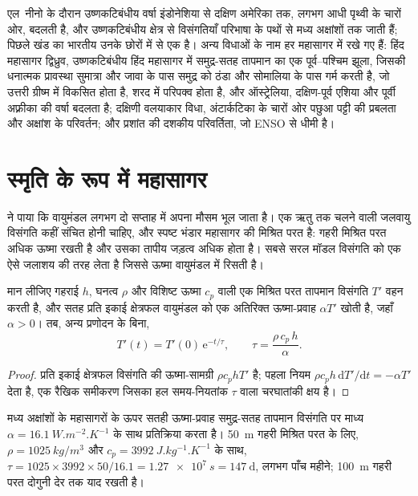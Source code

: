 एल~नीनो के दौरान उष्णकटिबंधीय वर्षा इंडोनेशिया से दक्षिण अमेरिका तक, लगभग आधी
पृथ्वी के चारों ओर, बदलती है, और उष्णकटिबंधीय क्षेत्र से विसंगतियाँ परिभाषा के पथों से मध्य अक्षांशों तक
जाती हैं; पिछले खंड का भारतीय  उनके छोरों में से एक है। अन्य विधाओं के नाम
हर महासागर में रखे गए हैं: हिंद महासागर द्विध्रुव, उष्णकटिबंधीय हिंद महासागर में समुद्र-सतह
तापमान का एक पूर्व--पश्चिम झूला, जिसकी धनात्मक प्रावस्था सुमात्रा और जावा के पास समुद्र को ठंडा
और सोमालिया के पास गर्म करती है, जो उत्तरी ग्रीष्म में विकसित होता है, शरद में परिपक्व होता है, और
ऑस्ट्रेलिया, दक्षिण-पूर्व एशिया और पूर्वी अफ़्रीका की वर्षा बदलता है; दक्षिणी वलयाकार विधा, अंटार्कटिका के चारों ओर
पछुआ पट्टी की प्रबलता और अक्षांश के परिवर्तन; और प्रशांत की दशकीय परिवर्तिता,
जो ENSO से धीमी है।

\section{स्मृति के रूप में महासागर}\label{sec:b2:climate-variability:memory}

 ने पाया कि वायुमंडल लगभग दो सप्ताह में अपना मौसम भूल जाता है।
एक ऋतु तक चलने वाली जलवायु विसंगति कहीं संचित होनी चाहिए, और स्पष्ट भंडार महासागर की मिश्रित
परत है: गहरी मिश्रित परत अधिक ऊष्मा रखती है और उसका तापीय जड़त्व अधिक होता है। सबसे सरल मॉडल
विसंगति को एक ऐसे जलाशय की तरह लेता है जिससे ऊष्मा वायुमंडल में रिसती है।

\begin{proposition}\label{prop:b2:climate-variability:damping}
मान लीजिए गहराई $h$, घनत्व $\rho$ और विशिष्ट ऊष्मा $c_p$ वाली एक मिश्रित परत तापमान विसंगति
$T'$ वहन करती है, और सतह प्रति इकाई क्षेत्रफल वायुमंडल को एक अतिरिक्त ऊष्मा-प्रवाह $\alpha T'$ खोती है,
जहाँ $\alpha > 0$। तब, अन्य प्रणोदन के बिना,
\[
  T'(t) = T'(0)\,\mathrm{e}^{-t/\tau}, \qquad \tau = \frac{\rho\,c_p\,h}{\alpha} .
\]
\end{proposition}

\begin{proof}
प्रति इकाई क्षेत्रफल विसंगति की ऊष्मा-सामग्री $\rho c_p h T'$ है; पहला नियम $\rho c_p h
\,\mathrm{d}T'/\mathrm{d}t = -\alpha T'$ देता है, एक रैखिक समीकरण जिसका हल
समय-नियतांक $\tau$ वाला चरघातांकी क्षय है।
\end{proof}

\begin{example}[मध्य-अक्षांशीय महासागर की स्मृति]\label{ex:b2:climate-variability:tau}
मध्य अक्षांशों के महासागरों के ऊपर सतही ऊष्मा-प्रवाह समुद्र-सतह तापमान विसंगति पर
माध्य $\alpha = \qty{16.1}{W.m^{-2}.K^{-1}}$ के साथ प्रतिक्रिया करता है। \qty{50}{m} गहरी मिश्रित परत के लिए,
$\rho = \qty{1025}{kg/m^3}$ और $c_p = \qty{3992}{J.kg^{-1}.K^{-1}}$ के साथ,
$\tau = 1025 \times 3992 \times 50/16.1 = \qty{1.27e7}{s} = \qty{147}{\day}$, लगभग पाँच
महीने; \qty{100}{m} गहरी परत दोगुनी देर तक याद रखती है।
\end{example}

